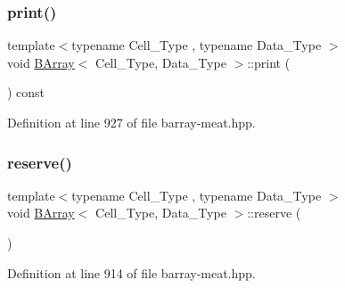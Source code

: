 \mbox{\label{group__barray-insert_ga9d150c44b23cf1e4af45f540508db1de}} 
\subsubsection{\texorpdfstring{print()}{print()}}
{\footnotesize\ttfamily template$<$typename Cell\+\_\+\+Type , typename Data\+\_\+\+Type $>$ \\
void \hyperlink{class_b_array}{B\+Array}$<$ Cell\+\_\+\+Type, Data\+\_\+\+Type $>$\+::print (\begin{DoxyParamCaption}{ }\end{DoxyParamCaption}) const\hspace{0.3cm}{\ttfamily [inline]}}



Definition at line 927 of file barray-\/meat.\+hpp.

\mbox{\label{group__barray-insert_ga5eacd388e3d0f638f2c35b6e0f0c490c}} 
\subsubsection{\texorpdfstring{reserve()}{reserve()}}
{\footnotesize\ttfamily template$<$typename Cell\+\_\+\+Type , typename Data\+\_\+\+Type $>$ \\
void \hyperlink{class_b_array}{B\+Array}$<$ Cell\+\_\+\+Type, Data\+\_\+\+Type $>$\+::reserve (\begin{DoxyParamCaption}{ }\end{DoxyParamCaption})\hspace{0.3cm}{\ttfamily [inline]}}



Definition at line 914 of file barray-\/meat.\+hpp.

\mbox{\label{group__barray-insert_gaefe411fe1890273518bfbc3f8ca616ce}} 
